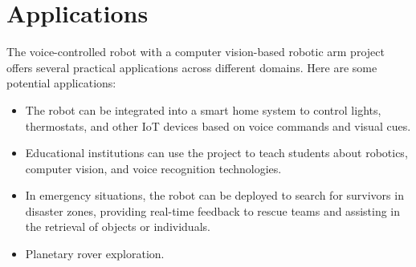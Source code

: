 \chapter{Applications}
The voice-controlled robot with a computer vision-based robotic arm project offers several practical applications across different domains. Here are some potential applications:
\begin{itemize}
    \item The robot can be integrated into a smart home system to control lights, thermostats, and other IoT devices based on voice commands and visual cues.
    \item Educational institutions can use the project to teach students about robotics, computer vision, and voice recognition technologies.
    \item In emergency situations, the robot can be deployed to search for survivors in disaster zones, providing real-time feedback to rescue teams and assisting in the retrieval of objects or individuals.
    \item Planetary rover exploration.
    
\end{itemize}

